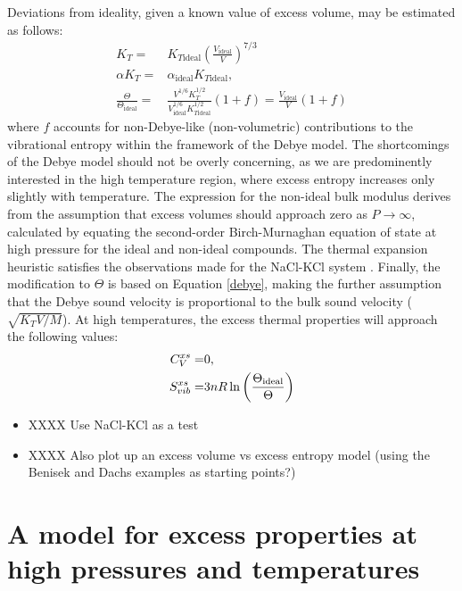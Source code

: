 Deviations from ideality, given a known value of excess volume, may be estimated as follows:
\begin{eqnarray}
K_T =& K_{T\textrm{ideal}} \left(\frac{V_{\textrm{ideal}}}{V}\right)^{7/3} \label{eqn:KV_relation} \\
\alpha K_T =& \alpha_{\textrm{ideal}} K_{T\textrm{ideal}}, \\
\frac{\Theta}{\Theta_{\textrm{ideal}}} =& \frac{V^{1/6} K_T^{1/2}}{V_{\textrm{ideal}}^{1/6} K_{T\textrm{ideal}}^{1/2}}(1+f) = \frac{V_{\textrm{ideal}}}{V}( 1 +f )
\end{eqnarray}
\noindent where $f$ accounts for non-Debye-like (non-volumetric) contributions to the vibrational entropy within the framework of the Debye model. The shortcomings of the Debye model should not be overly concerning, as we are predominently interested in the high temperature region, where excess entropy increases only slightly with temperature. The expression for the non-ideal bulk modulus derives from the assumption that excess volumes should approach zero as $P \rightarrow \infty$, calculated by equating the second-order Birch-Murnaghan equation of state at high pressure for the ideal and non-ideal compounds. The thermal expansion heuristic satisfies the observations made for the NaCl-KCl system \citep{WVCJCB2004, WVCCJB2005}. Finally, the modification to $\Theta$ is based on Equation \ref{debye}, making the further assumption that the Debye sound velocity is proportional to the bulk sound velocity ($\sqrt{K_T V / M}$). At high temperatures, the excess thermal properties will approach the following values:
\begin{eqnarray}
C_V^{xs} =& 0, \\
S_{vib}^{xs} =& 3nR \ln \left( { \Theta_{\textrm{ideal}} \over \Theta} \right)
\end{eqnarray}

\begin{itemize}
\item XXXX Use NaCl-KCl as a test
\item XXXX Also plot up an excess volume vs excess entropy model (using the Benisek and Dachs examples as starting points?)
\end{itemize}

\section{A model for excess properties at high pressures and temperatures}

